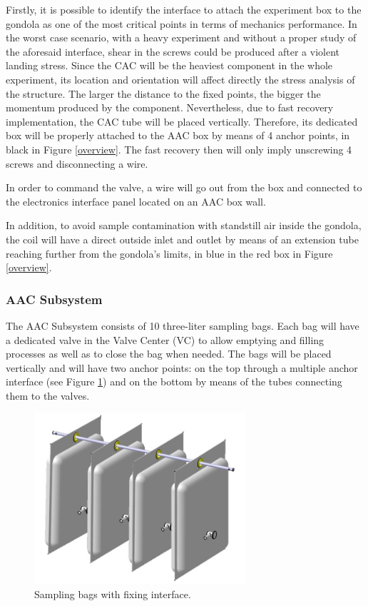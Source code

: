 \smallskip
Firstly, it is possible to identify the interface to attach the experiment box to the gondola as one of the most critical points in terms of mechanics performance. In the worst case scenario, with a heavy experiment and without a proper study of the aforesaid interface, shear in the screws could be produced after a violent landing stress. Since the CAC will be the heaviest component in the whole experiment, its location and orientation will affect directly the stress analysis of the structure. The larger the distance to the fixed points, the bigger the momentum produced by the component. Nevertheless, due to fast recovery implementation, the CAC tube will be placed vertically. Therefore, its dedicated box will be properly attached to the AAC box by means of 4 anchor points, in black in Figure \ref{overview}. The fast recovery then will only imply unscrewing 4 screws and disconnecting a wire. 

\smallskip
In order to command the valve, a wire will go out from the box and connected to the electronics interface panel located on an AAC box wall.

\smallskip
In addition, to avoid sample contamination with standstill air inside the gondola, the coil will have a direct outside inlet and outlet by means of an extension tube reaching further from the gondola’s limits, in blue in the red box in Figure \ref{overview}.


\subsubsection{AAC Subsystem}

The AAC Subsystem consists of 10 three-liter sampling bags. Each bag will have a dedicated valve in the Valve Center (VC) to allow emptying and filling processes as well as to close the bag when needed. The bags will be placed vertically and will have two anchor points: on the top through a  multiple anchor interface (see Figure \ref{anchor_bags}) and on the bottom by means of the tubes connecting them to the valves.


\begin{figure}[!ht]
    \centering
    \includegraphics[width=0.7\textwidth]{4-experiment-design/img/bags_assembly.jpg}
    \caption{Sampling bags with fixing interface.}
    \label{anchor_bags}
\end{figure}

